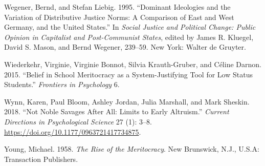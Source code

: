 \documentclass[
  letterpaper,
  DIV=11,
  numbers=noendperiod]{scrartcl}
\newlength{\cslhangindent}
\newlength{\cslentryspacingunit} %
\newenvironment{CSLReferences}[2] %
 {%
  \setlength{\parindent}{0pt}
  \ifodd #1
  \let\oldpar\par
  \def\par{\hangindent=\cslhangindent\oldpar}
  \fi
  \setlength{\parskip}{#2\cslentryspacingunit}
 }%
 {}
\begin{document}
\begin{CSLReferences}{1}{0}
\leavevmode{}%
Wegener, Bernd, and Stefan Liebig. 1995. {``Dominant {Ideologies} and
the {Variation} of {Distributive Justice Norms}: {A Comparison} of
{East} and {West Germany}, and the {United States}.''} In \emph{Social
{Justice} and {Political Change}: {Public Opinion} in {Capitalist} and
{Post-Communist States}}, edited by James R. Kluegel, David S. Mason,
and Bernd Wegener, 239--59. New York: Walter de Gruyter.

\leavevmode{}%
Wiederkehr, Virginie, Virginie Bonnot, Silvia Krauth-Gruber, and Céline
Darnon. 2015. {``Belief in School Meritocracy as a System-Justifying
Tool for Low Status Students.''} \emph{Frontiers in Psychology} 6.

\leavevmode{}%
Wynn, Karen, Paul Bloom, Ashley Jordan, Julia Marshall, and Mark
Sheskin. 2018. {``Not {Noble Savages After All}: {Limits} to {Early
Altruism}.''} \emph{Current Directions in Psychological Science} 27 (1):
3--8. \url{https://doi.org/10.1177/0963721417734875}.

\leavevmode{}%
Young, Michael. 1958. \emph{The Rise of the Meritocracy}. New Brunswick,
N.J., U.S.A: Transaction Publishers.

\end{CSLReferences}
\end{document}
